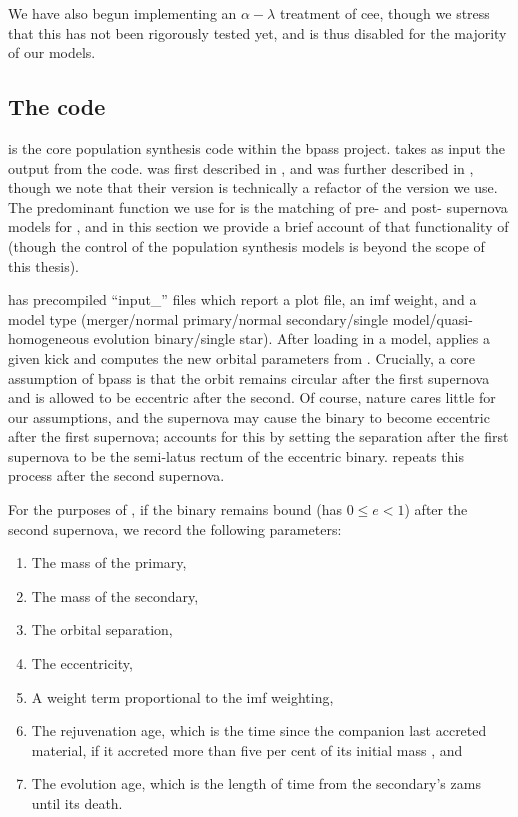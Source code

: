 We have also begun implementing an $\alpha-\lambda$ treatment of \gls{cee}, though we stress that this has not been rigorously tested yet, and is thus disabled for the majority of our models.

\subsection{The  code}\label{chap:numerical_methods_tui}

 is the core population synthesis code within the \gls{bpass} project.  takes as input the output from the  code.  was first described in \citet{Ghodla:2023}, and was further described in \citet{Stevance:2023}, though we note that their version is technically a refactor of the version we use. The predominant function we use  for is the matching of pre- and post- supernova models for , and in this section we provide a brief account of that functionality of  (though the control of the population synthesis models is beyond the scope of this thesis).

 has precompiled ``input\_'' files which report a  plot file, an \gls{imf} weight, and a model type (merger/normal primary/normal secondary/single model/quasi-homogeneous evolution binary/single star). After loading in a model,  applies a given kick and computes the new orbital parameters from \citet{Tauris:1998}. Crucially, a core assumption of \gls{bpass} is that the orbit remains circular after the first supernova and is allowed to be eccentric after the second. Of course, nature cares little for our assumptions, and the supernova may cause the binary to become eccentric after the first supernova;  accounts for this by setting the separation after the first supernova to be the semi-latus rectum of the eccentric binary.  repeats this process after the second supernova.

For the purposes of , if the binary remains bound (has $0\leq e < 1$) after the second supernova, we record the following parameters:

\begin{enumerate}
    \item The mass of the primary,
    \item The mass of the secondary,
    \item The orbital separation,
    \item The eccentricity,
    \item A weight term proportional to the \gls{imf} weighting,
    \item The rejuvenation age, which is the time since the companion last accreted material, if it accreted more than five per cent of its initial mass \citep[see][]{Richards:2023}, and
    \item The evolution age, which is the length of time from the secondary's \gls{zams} until its death.
\end{enumerate}


